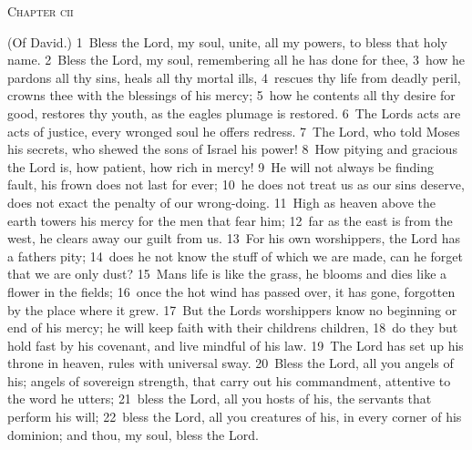 \documentclass[10pt]{book} %
\begin{document}
\begin{large}\begin{center}\textsc{Chapter cii}\end{center}\end{large}
(Of David.)
\textcolor{benred8}{1}~Bless the Lord, my soul, unite, all my powers, to bless that holy name. \textcolor{benred8}{2}~Bless the Lord, my soul, remembering all he has done for thee, \textcolor{benred8}{3}~how he pardons all thy sins, heals all thy mortal ills, \textcolor{benred8}{4}~rescues thy life from deadly peril, crowns thee with the blessings of his mercy; \textcolor{benred8}{5}~how he contents all thy desire for good, restores thy youth, as the eagle\textquotesingle s plumage is restored. \textcolor{benred8}{6}~The Lord\textquotesingle s acts are acts of justice, every wronged soul he offers redress. \textcolor{benred8}{7}~The Lord, who told Moses his secrets, who shewed the sons of Israel his power!
\textcolor{benred8}{8}~How pitying and gracious the Lord is, how patient, how rich in mercy! \textcolor{benred8}{9}~He will not always be finding fault, his frown does not last for ever; \textcolor{benred8}{10}~he does not treat us as our sins deserve, does not exact the penalty of our wrong-doing. \textcolor{benred8}{11}~High as heaven above the earth towers his mercy for the men that fear him; \textcolor{benred8}{12}~far as the east is from the west, he clears away our guilt from us. \textcolor{benred8}{13}~For his own worshippers, the Lord has a father\textquotesingle s pity; \textcolor{benred8}{14}~does he not know the stuff of which we are made, can he forget that we are only dust? \textcolor{benred8}{15}~Man\textquotesingle s life is like the grass, he blooms and dies like a flower in the fields; \textcolor{benred8}{16}~once the hot wind has passed over, it has gone, forgotten by the place where it grew. \textcolor{benred8}{17}~But the Lord\textquotesingle s worshippers know no beginning or end of his mercy; he will keep faith with their children\textquotesingle s children, \textcolor{benred8}{18}~do they but hold fast by his covenant, and live mindful of his law. \textcolor{benred8}{19}~The Lord has set up his throne in heaven, rules with universal sway. \textcolor{benred8}{20}~Bless the Lord, all you angels of his; angels of sovereign strength, that carry out his commandment, attentive to the word he utters; \textcolor{benred8}{21}~bless the Lord, all you hosts of his, the servants that perform his will; \textcolor{benred8}{22}~bless the Lord, all you creatures of his, in every corner of his dominion; and thou, my soul, bless the Lord.
\end{document}
